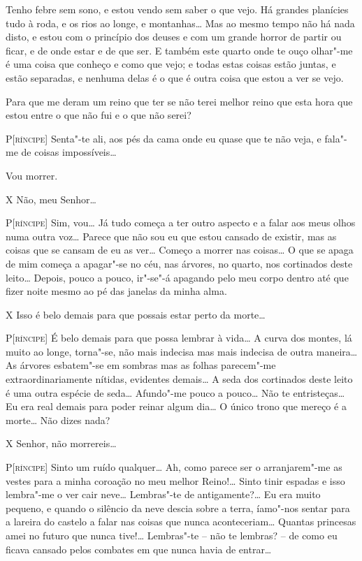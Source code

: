 Tenho febre sem sono, e estou vendo sem saber o que vejo. Há grandes
planícies tudo à roda, e os rios ao longe, e montanhas\ldots{} Mas ao
mesmo tempo não há nada disto, e estou com o princípio dos deuses e
com um grande horror de partir ou ficar, e de onde estar e de que
ser. E também este quarto onde te ouço olhar"-me é uma coisa que
conheço e como que vejo; e todas estas coisas estão juntas, e estão
separadas, e nenhuma delas é o que é outra coisa que estou a ver se
vejo.

Para que me deram um reino que ter se não terei melhor reino que esta
hora que estou entre o que não fui e o que não serei?

\textsc{P[ríncipe]} Senta"-te ali, aos pés da cama onde eu quase que te não
veja, e fala"-me de coisas impossíveis\ldots{}

Vou morrer.

\textsc{X} Não, meu Senhor\ldots{}

\textsc{P[ríncipe]} Sim, vou\ldots{} Já tudo começa a ter outro aspecto e a falar
aos meus olhos numa outra voz\ldots{} Parece que não sou eu que estou
cansado de existir, mas as coisas que se cansam de eu as ver\ldots{}
Começo a morrer nas coisas\ldots{} O que se apaga de mim começa a
apagar"-se no céu, nas árvores, no quarto, nos cortinados deste leito…
Depois, pouco a pouco, ir"-se"-á apagando pelo meu corpo dentro até que
fizer noite mesmo ao pé das janelas da minha alma. 

\textsc{X} Isso é belo demais para que possais estar perto da morte\ldots{}

\textsc{P[ríncipe]} É belo demais para que possa lembrar à vida\ldots{} A curva
dos montes, lá muito ao longe, torna"-se, não mais indecisa mas mais
indecisa de outra maneira\ldots{} As árvores esbatem"-se em sombras mas as
folhas parecem"-me extraordinariamente nítidas, evidentes demais\ldots{} A
seda dos cortinados deste leito é uma outra espécie de seda\ldots{}
Afundo"-me pouco a pouco\ldots{} Não te entristeças\ldots{} Eu era real demais
para poder reinar algum dia\ldots{} O único trono que mereço é a morte\ldots{}
Não dizes nada?

\textsc{X} Senhor, não morrereis\ldots{}

\textsc{P[ríncipe]} Sinto um ruído qualquer\ldots{} Ah, como parece ser o
arranjarem"-me as vestes para a minha coroação no meu melhor Reino!\ldots{}
Sinto tinir espadas e isso lembra"-me o ver cair neve\ldots{} Lembras"-te de
antigamente?\ldots{} Eu era muito pequeno, e quando o silêncio da neve
descia sobre a terra, íamo"-nos sentar para a lareira do castelo a
falar nas coisas que nunca aconteceriam\ldots{} Quantas princesas amei no
futuro que nunca tive!\ldots{} Lembras"-te -- não te lembras? -- de como eu
ficava cansado pelos combates em que nunca havia de entrar\ldots{}

